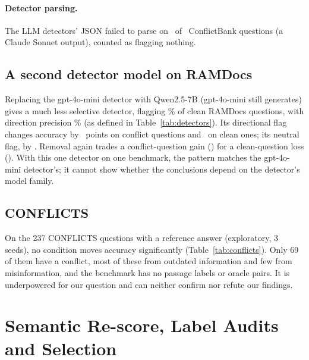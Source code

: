 \paragraph{Detector parsing.} The LLM detectors' JSON failed to parse on \parseFailTotal\ of \parseFailN\ ConflictBank
questions (a Claude Sonnet output), counted as flagging nothing.

\subsection{A second detector model on RAMDocs}
Replacing the gpt-4o-mini detector with Qwen2.5-7B (gpt-4o-mini still generates) gives a much less selective
detector, flagging \qdetFpr\% of clean RAMDocs questions, with direction precision \qdetDir\% (as defined in
Table~\ref{tab:detectors}). Its directional flag changes accuracy by \zQDetLlmDirFlagDirectionalConflict\ points on
conflict questions and \zQDetLlmDirFlagDirectionalClean\ on clean ones; its neutral flag, by
\zQDetLlmDirFlagConflict. Removal again trades a conflict-question gain (\zQDetLlmDirRemoveSuspectConflict) for a
clean-question loss (\zQDetLlmDirRemoveSuspectClean). With this one detector on one benchmark, the pattern matches the
gpt-4o-mini detector's; it cannot show whether the conclusions depend on the detector's model family.

\subsection{CONFLICTS}
On the 237 CONFLICTS questions with a reference answer (exploratory, 3 seeds), no condition moves accuracy
significantly (Table~\ref{tab:conflicts}). Only 69 of them have a conflict, most of these from outdated information
and few from misinformation, and the benchmark has no passage labels or oracle pairs. It is underpowered for our
question and can neither confirm nor refute our findings.

\clearpage
\section{Semantic Re-score, Label Audits and Selection}
\label{app:semantic}


